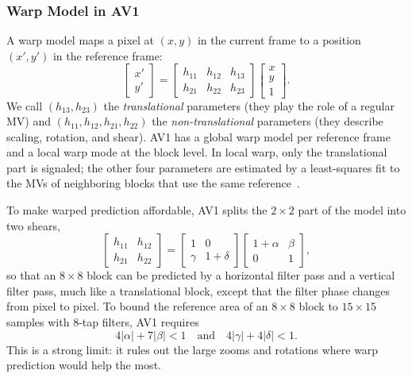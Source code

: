 \documentclass[journal]{IEEEtran}
\begin{document}
\subsubsection{Warp Model in AV1}
A warp model maps a pixel at $(x,y)$ in the current frame to a position
$(x',y')$ in the reference frame:
\begin{equation}
  \begin{bmatrix} x' \\ y' \end{bmatrix} =
  \begin{bmatrix} h_{11} & h_{12} & h_{13} \\ h_{21} & h_{22} & h_{23} \end{bmatrix}
  \begin{bmatrix} x \\ y \\ 1 \end{bmatrix}.
  \label{eq:warp_model}
\end{equation}
We call $(h_{13},h_{23})$ the \emph{translational} parameters (they play the
role of a regular MV) and $(h_{11},h_{12},h_{21},h_{22})$ the
\emph{non-translational} parameters (they describe scaling, rotation, and
shear). AV1 has a global warp model per reference frame and a local warp mode
at the block level. In local warp, only the translational part is signaled;
the other four parameters are estimated by a least-squares fit to the MVs of
neighboring blocks that use the same reference~\cite{warp-motion}.

To make warped prediction affordable, AV1 splits the $2{\times}2$ part of the
model into two shears,
\begin{equation}
  \begin{bmatrix} h_{11} & h_{12} \\ h_{21} & h_{22} \end{bmatrix} =
  \begin{bmatrix} 1 & 0 \\ \gamma & 1+\delta \end{bmatrix}
  \begin{bmatrix} 1+\alpha & \beta \\ 0 & 1 \end{bmatrix},
  \label{eq:shear}
\end{equation}
so that an $8{\times}8$ block can be predicted by a horizontal filter pass and
a vertical filter pass, much like a translational block, except that the
filter phase changes from pixel to pixel. To bound the reference area of an
$8{\times}8$ block to $15{\times}15$ samples with 8-tap filters, AV1 requires
\begin{equation}
  4|\alpha| + 7|\beta| < 1 \quad\text{and}\quad 4|\gamma| + 4|\delta| < 1 .
  \label{eq:warp_valid}
\end{equation}
This is a strong limit: it rules out the large zooms and rotations where warp
prediction would help the most.
\end{document}
